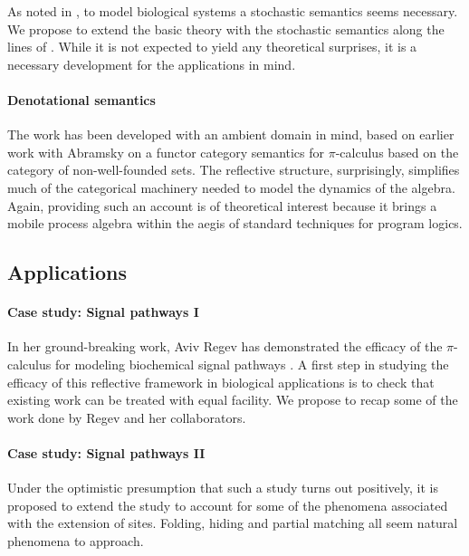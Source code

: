 \documentclass[]{amsart}
\theoremstyle{definition}
\theoremstyle{remark}
\numberwithin{equation}{subsection}
\newcommand{\pic}{$\pi$-calculus}
\begin{document}
As noted in \cite{priamimolecularprocesses}, to model biological systems a stochastic
semantics seems necessary. We propose to extend the basic theory with
the stochastic semantics along the lines of \cite{priamistochasticpi}. While it is not
expected to yield any theoretical surprises, it is a necessary
development for the applications in mind.

\paragraph{Denotational semantics} 

The work has been developed with an ambient domain in mind, based on
earlier work with Abramsky on a functor category semantics for {\pic}
based on the category of non-well-founded sets. The reflective
structure, surprisingly, simplifies much of the categorical machinery
needed to model the dynamics of the algebra. Again, providing such an
account is of theoretical interest because it brings a mobile process
algebra within the aegis of standard techniques for program logics. \cite{AbramskyDTLF}

\subsection{Applications}

\paragraph{Case study: Signal pathways I} 

In her ground-breaking work, Aviv Regev has demonstrated the efficacy
of the {\pic} for modeling biochemical signal pathways
\cite{RegevMolecularPathwaysPi}. A first step in studying the efficacy
of this reflective framework in biological applications is to check
that existing work can be treated with equal facility. We propose to
recap some of the work done by Regev and her collaborators.

\paragraph{Case study: Signal pathways II} 

Under the optimistic presumption that such a study turns out
positively, it is proposed to extend the study to account for some of
the phenomena associated with the extension of sites. Folding, hiding
and partial matching all seem natural phenomena to approach.
\end{document}
